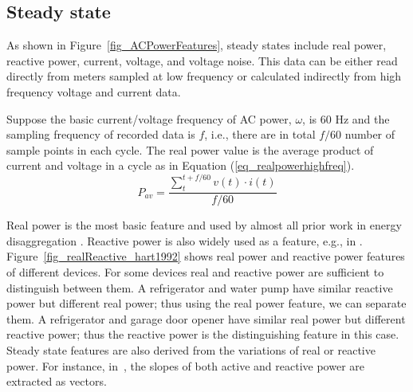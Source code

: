 \subsection{Steady state}
\iffalse
\huijuanc{comment out until huijuan's next comment}
As shown in Figure~\ref{fig_ACPowerFeatures}, 
steady state features include real and reactive power from both 
low frequency and high frequency data, 
current or voltage from high frequency data, 
and voltage noise. \manishc{figure 11 doesn't show anything about high/low frequency} 
\huijuanc{agree. rewritten as follows.}
\fi
As shown in Figure~\ref{fig_ACPowerFeatures}, 
steady states include real power, reactive power, 
current, voltage, 
and voltage noise. 
This data can be either read directly from meters
sampled at low frequency or calculated indirectly from 
high frequency voltage and current data. 
\iffalse
\manishc{in this sentence, are
  you saying the meters that sample at low frequency compute the real/reactive
  power, while the meters that sample at high frequency do not?} 
  \huijuanc{Yes, this is what I mean. Is it correct?}
\fi  
Suppose the basic current/voltage frequency of
AC power, $\omega$, is 60 Hz
and the sampling frequency of recorded data is $f$,
i.e., there are in total $f/60$ number of sample points in
each cycle.
The real power value is the average product
of current and voltage in a cycle as in Equation (\ref{eq_realpowerhighfreq}). 
\begin{equation}
P_{av}= \frac{\sum_{t}^{t+f/60} v(t) \cdot i(t)}{f/60}
\label{eq_realpowerhighfreq}
\end{equation}

Real power is the most basic feature and used 
by almost all prior work in energy disaggregation \cite{hart1992,powers1991using,farinaccio1999using,marceau2000nonintrusive,baranski2004genetic,baranski2004detecting}.
Reactive power is also widely used as a feature, e.g., in \cite{hart1992,laughman2003power,drenker1999nonintrusive}.
Figure~\ref{fig_realReactive_hart1992} shows real power and 
reactive power features of different devices. 
For some devices real and reactive power are sufficient to distinguish
between them. 
A refrigerator and water pump have similar reactive power but
different real power; thus using the real power feature, we can separate them. 
A refrigerator and garage door opener have similar real power but different reactive power;
thus the reactive power is the distinguishing feature in this case.
Steady state features are also derived from the variations of real or reactive power.
For instance, in~\cite{milioudis2013event}, 
the slopes of both active and reactive power 
are extracted as vectors. %


